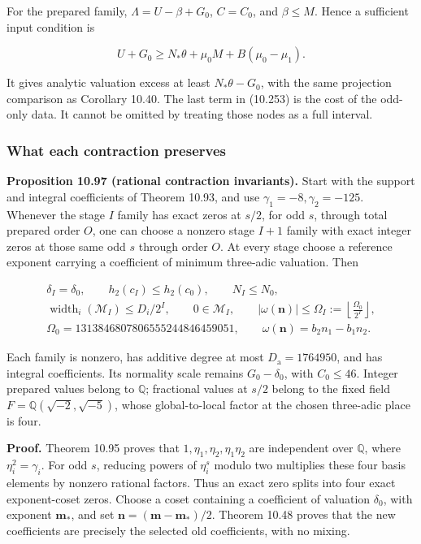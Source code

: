 \documentclass[
  11pt,
  a4paper,
]{article}
\begin{document}
For the prepared family, \(\Lambda=U-\beta+G_0\), \(C=C_0\), and
\(\beta\le M\). Hence a sufficient input condition is

\[
U+G_0\ge N_*\theta+\mu_0M+B(\mu_0-\mu_1).
\tag{10.253}
\]

It gives analytic valuation excess at least \(N_*\theta-G_0\), with the
same projection comparison as Corollary 10.40. The last term in (10.253)
is the cost of the odd-only data. It cannot be omitted by treating those
nodes as a full interval.

\subsubsection{What each contraction
preserves}\label{what-each-contraction-preserves}

\textbf{Proposition 10.97 (rational contraction invariants).} Start with
the support and integral coefficients of Theorem 10.93, and use
\(\gamma_1=-8,\gamma_2=-125\). Whenever the stage \(I\) family has exact
zeros at \(s/2\), for odd \(s\), through total prepared order \(O\), one
can choose a nonzero stage \(I+1\) family with exact integer zeros at
those same odd \(s\) through order \(O\). At every stage choose a
reference exponent carrying a coefficient of minimum three-adic
valuation. Then

\[
\begin{gathered}
\delta_I=\delta_0,\qquad h_2(c_I)\le h_2(c_0),\qquad N_I\le N_0,\\
\operatorname{width}_i(\mathcal M_I)\le D_i/2^I,\qquad
0\in\mathcal M_I,\qquad
|\omega(\boldsymbol n)|\le\Omega_I:=
\left\lfloor\frac{\Omega_0}{2^I}\right\rfloor,\\
\Omega_0=1313846807806555244846459051,\qquad
\omega(\boldsymbol n)=b_2n_1-b_1n_2.
\end{gathered}
\tag{10.254}
\]

Each family is nonzero, has additive degree at most
\(D_{\mathrm a}=1764950\), and has integral coefficients. Its normality
scale remains \(G_0-\delta_0\), with \(C_0\le46\). Integer prepared
values belong to \(\mathbb Q\); fractional values at \(s/2\) belong to
the fixed field \(F=\mathbb Q(\sqrt{-2},\sqrt{-5})\), whose
global-to-local factor at the chosen three-adic place is four.

\textbf{Proof.} Theorem 10.95 proves that
\(1,\eta_1,\eta_2,\eta_1\eta_2\) are independent over \(\mathbb Q\),
where \(\eta_i^2=\gamma_i\). For odd \(s\), reducing powers of
\(\eta_i^s\) modulo two multiplies these four basis elements by nonzero
rational factors. Thus an exact zero splits into four exact
exponent-coset zeros. Choose a coset containing a coefficient of
valuation \(\delta_0\), with exponent \(\boldsymbol m_*\), and set
\(\boldsymbol n=(\boldsymbol m-\boldsymbol m_*)/2\). Theorem 10.48
proves that the new coefficients are precisely the selected old
coefficients, with no mixing.
\end{document}
